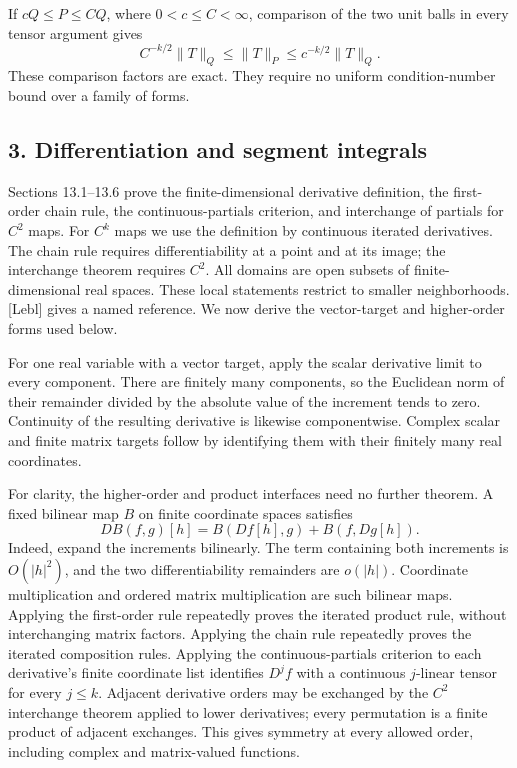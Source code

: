 \documentclass[
  11pt,
]{article}
\begin{document}
If \(cQ\leq P\leq CQ\), where \(0<c\leq C<\infty\), comparison of the
two unit balls in every tensor argument gives \[
C^{-k/2}\|T\|_Q\leq\|T\|_P\leq c^{-k/2}\|T\|_Q.
\] These comparison factors are exact. They require no uniform
condition-number bound over a family of forms.

\subsection{3. Differentiation and segment
integrals}\label{differentiation-and-segment-integrals}

Sections 13.1--13.6 prove the finite-dimensional derivative definition,
the first-order chain rule, the continuous-partials criterion, and
interchange of partials for \(C^2\) maps. For \(C^k\) maps we use the
definition by continuous iterated derivatives. The chain rule requires
differentiability at a point and at its image; the interchange theorem
requires \(C^2\). All domains are open subsets of finite-dimensional
real spaces. These local statements restrict to smaller neighborhoods.
{[}Lebl{]} gives a named reference. We now derive the vector-target and
higher-order forms used below.

For one real variable with a vector target, apply the scalar derivative
limit to every component. There are finitely many components, so the
Euclidean norm of their remainder divided by the absolute value of the
increment tends to zero. Continuity of the resulting derivative is
likewise componentwise. Complex scalar and finite matrix targets follow
by identifying them with their finitely many real coordinates.

For clarity, the higher-order and product interfaces need no further
theorem. A fixed bilinear map \(B\) on finite coordinate spaces
satisfies \[
D B(f,g)[h]=B(Df[h],g)+B(f,Dg[h]).
\] Indeed, expand the increments bilinearly. The term containing both
increments is \(O(|h|^2)\), and the two differentiability remainders are
\(o(|h|)\). Coordinate multiplication and ordered matrix multiplication
are such bilinear maps. Applying the first-order rule repeatedly proves
the iterated product rule, without interchanging matrix factors.
Applying the chain rule repeatedly proves the iterated composition
rules. Applying the continuous-partials criterion to each derivative's
finite coordinate list identifies \(D^j f\) with a continuous
\(j\)-linear tensor for every \(j\leq k\). Adjacent derivative orders
may be exchanged by the \(C^2\) interchange theorem applied to lower
derivatives; every permutation is a finite product of adjacent
exchanges. This gives symmetry at every allowed order, including complex
and matrix-valued functions.
\end{document}
